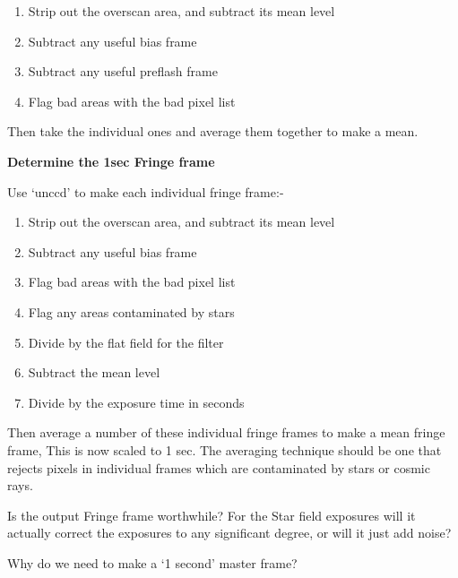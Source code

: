\begin{small}
{{\begin{enumerate}
\item Strip out the overscan area, and subtract its mean level
\item Subtract any useful bias frame
\item Subtract any useful preflash frame
\item Flag bad areas with the bad pixel list
\end{enumerate}
 
 Then take the individual ones and average them together to make
 a mean.
 
{\hspace*{4ex} \bf  Determine the 1sec Fringe frame}
 
 Use `unccd' to make each individual fringe frame:-
 
\begin{enumerate}
\item Strip out the overscan area, and subtract its mean level
\item Subtract any useful bias frame
\item Flag bad areas with the bad pixel list
\item Flag any areas contaminated by stars
\item Divide by the flat field for the filter
\item Subtract the mean level
\item Divide by the exposure time in seconds
\end{enumerate}
 
Then average a number of these individual fringe frames to make a mean
fringe frame, This is now scaled to 1 sec. The averaging technique
should be one that rejects pixels in individual frames which are
contaminated by stars or cosmic rays.
 
Is the output Fringe frame worthwhile? For the Star field exposures will
it actually correct the exposures to any significant degree, or
will it just add noise?
 
Why do we need to make a `1 second' master frame?
 
 
}}
\end{small}
